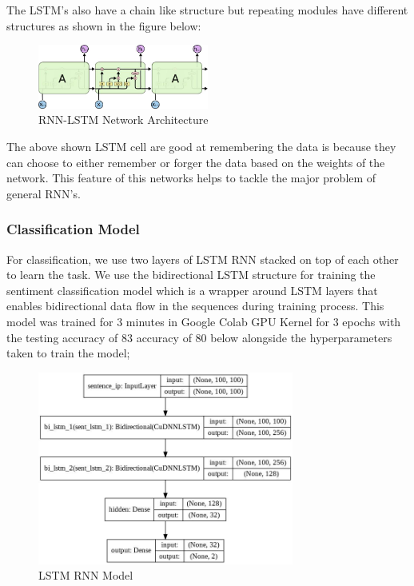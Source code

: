 The LSTM’s also have a chain like structure but repeating modules have different
structures as shown in the figure below:

        \begin{figure}[hbt!]
            \centering
                \includegraphics[width=0.5\textwidth]{./img/6.14.jpg}
                \caption{RNN-LSTM Network Architecture}
        \end{figure}
The above shown LSTM cell are good at remembering the data is because they can
choose to either remember or forger the data based on the weights of the network. This
feature of this networks helps to tackle the major problem of general RNN’s.
            \subsubsection{Classification Model}
For classification, we use two layers of LSTM RNN stacked on top of each other to
learn the task. We use the bidirectional LSTM structure for training the sentiment
classification model which is a wrapper around LSTM layers that enables bidirectional
data flow in the sequences during training process. This model was trained for 3 minutes
in Google Colab GPU Kernel for 3 epochs with the testing accuracy of 83%
accuracy of 80%
below alongside the hyperparameters taken to train the model;
        \begin{figure}[hbt!]
            \centering
                \includegraphics[width=0.75\textwidth]{./img/6.15.jpg}
                \caption{LSTM RNN Model}
        \end{figure}
        
